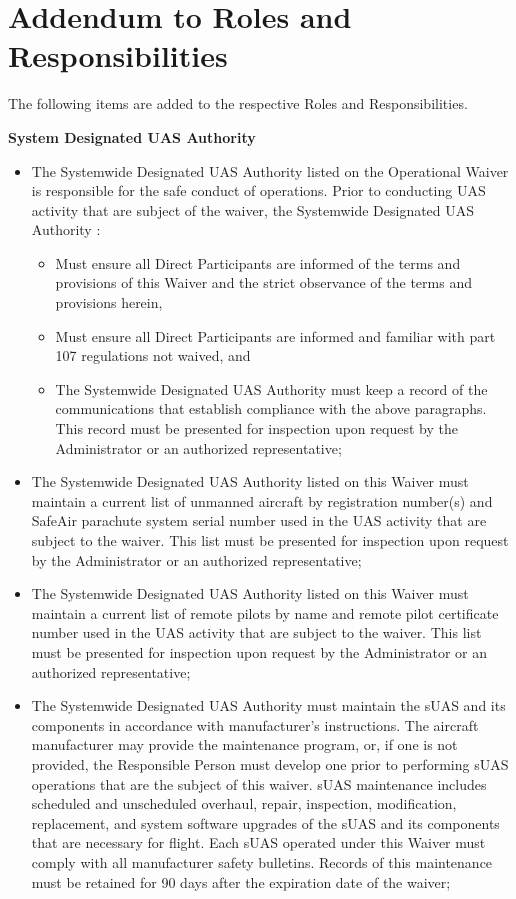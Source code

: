 \documentclass[
]{book}
\providecommand{\tightlist}{%
  \setlength{\itemsep}{0pt}\setlength{\parskip}{0pt}}
\begin{document}
\hypertarget{s39p-rr}{%
\section{Addendum to Roles and Responsibilities}\label{s39p-rr}}

The following items are added to the respective Roles and Responsibilities.

\textbf{System Designated UAS Authority}

\begin{itemize}
\item
  The Systemwide Designated UAS Authority listed on the Operational Waiver is responsible for the safe conduct of operations. Prior to conducting UAS activity that are subject of the waiver, the Systemwide Designated UAS Authority :

  \begin{itemize}
  \tightlist
  \item
    Must ensure all Direct Participants are informed of the terms and provisions of this Waiver and the strict observance of the terms and provisions herein,
  \item
    Must ensure all Direct Participants are informed and familiar with part 107 regulations not waived, and
  \item
    The Systemwide Designated UAS Authority must keep a record of the communications that establish compliance with the above paragraphs. This record must be presented for inspection upon request by the Administrator or an authorized representative;
  \end{itemize}
\item
  The Systemwide Designated UAS Authority listed on this Waiver must maintain a current list of unmanned aircraft by registration number(s) and SafeAir parachute system serial number used in the UAS activity that are subject to the waiver. This list must be presented for inspection upon request by the Administrator or an authorized representative;
\item
  The Systemwide Designated UAS Authority listed on this Waiver must maintain a current list of remote pilots by name and remote pilot certificate number used in the UAS activity that are subject to the waiver. This list must be presented for inspection upon request by the Administrator or an authorized representative;
\item
  The Systemwide Designated UAS Authority must maintain the sUAS and its components in accordance with manufacturer's instructions. The aircraft manufacturer may provide the maintenance program, or, if one is not provided, the Responsible Person must develop one prior to performing sUAS operations that are the subject of this waiver. sUAS maintenance includes scheduled and unscheduled overhaul, repair, inspection, modification, replacement, and system software upgrades of the sUAS and its components that are necessary for flight. Each sUAS operated under this Waiver must comply with all manufacturer safety bulletins. Records of this maintenance must be retained for 90 days after the expiration date of the waiver;

\end{itemize}
\end{document}
